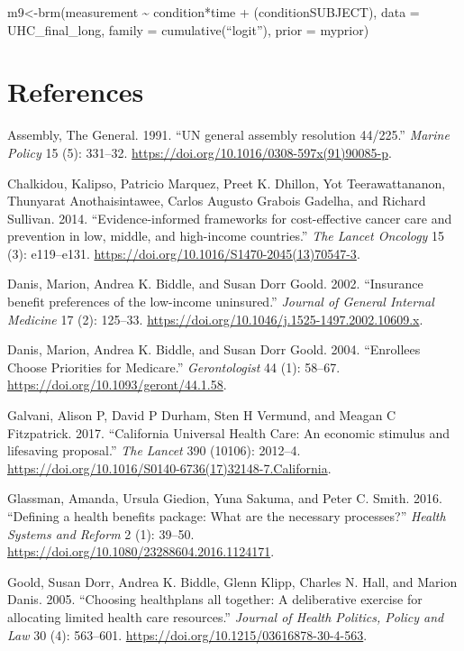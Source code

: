 \documentclass[
]{article}
\begin{document}
m9\textless-brm(measurement \textasciitilde{} condition*time +
(condition\textbar SUBJECT), data = UHC\_final\_long, family =
cumulative(``logit''), prior = myprior)

\hypertarget{references}{%
\section*{References}\label{references}}

\hypertarget{refs}{}
\leavevmode\hypertarget{ref-Assembly1991}{}%
Assembly, The General. 1991. ``UN general assembly resolution 44/225.''
\emph{Marine Policy} 15 (5): 331--32.
\url{https://doi.org/10.1016/0308-597x(91)90085-p}.

\leavevmode\hypertarget{ref-Chalkidou2014}{}%
Chalkidou, Kalipso, Patricio Marquez, Preet K. Dhillon, Yot
Teerawattananon, Thunyarat Anothaisintawee, Carlos Augusto Grabois
Gadelha, and Richard Sullivan. 2014. ``Evidence-informed frameworks for
cost-effective cancer care and prevention in low, middle, and
high-income countries.'' \emph{The Lancet Oncology} 15 (3): e119--e131.
\url{https://doi.org/10.1016/S1470-2045(13)70547-3}.

\leavevmode\hypertarget{ref-Danis2002}{}%
Danis, Marion, Andrea K. Biddle, and Susan Dorr Goold. 2002. ``Insurance
benefit preferences of the low-income uninsured.'' \emph{Journal of
General Internal Medicine} 17 (2): 125--33.
\url{https://doi.org/10.1046/j.1525-1497.2002.10609.x}.

\leavevmode\hypertarget{ref-Danis2004}{}%
Danis, Marion, Andrea K. Biddle, and Susan Dorr Goold. 2004. ``Enrollees
Choose Priorities for Medicare.'' \emph{Gerontologist} 44 (1): 58--67.
\url{https://doi.org/10.1093/geront/44.1.58}.

\leavevmode\hypertarget{ref-Galvani2017}{}%
Galvani, Alison P, David P Durham, Sten H Vermund, and Meagan C
Fitzpatrick. 2017. ``California Universal Health Care: An economic
stimulus and lifesaving proposal.'' \emph{The Lancet} 390 (10106):
2012--4. \url{https://doi.org/10.1016/S0140-6736(17)32148-7.California}.

\leavevmode\hypertarget{ref-Glassman2016}{}%
Glassman, Amanda, Ursula Giedion, Yuna Sakuma, and Peter C. Smith. 2016.
``Defining a health benefits package: What are the necessary
processes?'' \emph{Health Systems and Reform} 2 (1): 39--50.
\url{https://doi.org/10.1080/23288604.2016.1124171}.

\leavevmode\hypertarget{ref-Goold2005}{}%
Goold, Susan Dorr, Andrea K. Biddle, Glenn Klipp, Charles N. Hall, and
Marion Danis. 2005. ``Choosing healthplans all together: A deliberative
exercise for allocating limited health care resources.'' \emph{Journal
of Health Politics, Policy and Law} 30 (4): 563--601.
\url{https://doi.org/10.1215/03616878-30-4-563}.
\end{document}
